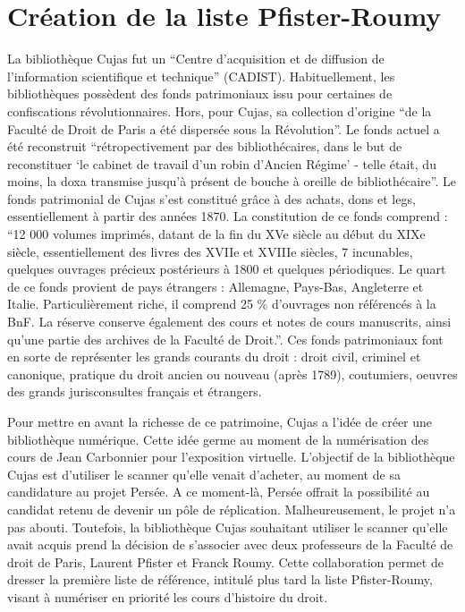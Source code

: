 \section[Pfister-Roumy]{Création de la liste Pfister-Roumy}

La  bibliothèque Cujas fut un \enquote{Centre d'acquisition et de diffusion de l'information scientifique et technique} (CADIST). Habituellement, les bibliothèques possèdent des fonds patrimoniaux issu pour certaines de confiscations révolutionnaires. Hors, pour Cujas, sa collection d'origine \enquote{de la Faculté de Droit de Paris a été dispersée sous la Révolution}. Le fonds actuel a été reconstruit \enquote{rétropectivement par des bibliothécaires, dans le but de reconstituer \enquote{le cabinet de travail d'un robin d'Ancien Régime} - telle était, du moins, la doxa transmise jusqu'à présent de bouche à oreille de bibliothécaire}. Le fonds patrimonial de Cujas s'est constitué grâce à des achats, dons et legs, essentiellement à partir des années 1870. La constitution de ce fonds comprend : \enquote{12 000 volumes imprimés, datant de la fin du XVe siècle au début du XIXe siècle, essentiellement des livres des XVIIe et XVIIIe siècles, 7 incunables, quelques ouvrages précieux postérieurs à 1800 et quelques périodiques. Le quart de ce fonds provient de pays étrangers : Allemagne, Pays-Bas, Angleterre et Italie. Particulièrement riche, il comprend 25 \% d'ouvrages non référencés à la BnF. La réserve conserve également des cours et notes de cours manuscrits, ainsi qu'une partie des archives de la Faculté de Droit.}. Ces fonds patrimoniaux font en sorte de représenter les grands courants du droit : droit civil, criminel et canonique, pratique du droit ancien ou nouveau (après 1789), coutumiers, oeuvres des grands jurisconsultes français et étrangers.
	
Pour mettre en avant la richesse de ce patrimoine, Cujas a l'idée de créer une bibliothèque numérique. Cette idée germe au moment de la numérisation des cours de Jean Carbonnier pour l'exposition virtuelle. L'objectif de la bibliothèque Cujas est d'utiliser le scanner qu'elle venait d'acheter, au moment de sa candidature au projet Persée. A ce moment-là, Persée offrait la possibilité au candidat retenu de devenir un pôle de réplication. Malheureusement, le projet n'a pas abouti. Toutefois, la bibliothèque Cujas souhaitant utiliser le scanner qu'elle avait acquis prend la décision de s'associer avec deux professeurs de la Faculté de droit de Paris, Laurent Pfister et Franck Roumy. Cette collaboration permet de dresser la première liste de référence, intitulé plus tard la liste Pfister-Roumy, visant à numériser en priorité les cours d'histoire du droit.

